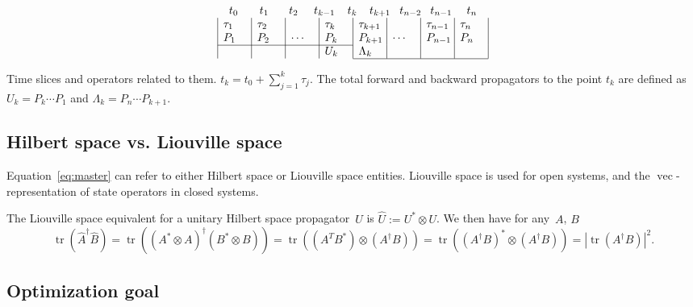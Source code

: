 \documentclass[aps, pra, a4paper, longbibliography]{revtex4}
\newcommand{\be}{\begin{equation}}
\newcommand{\ee}{\end{equation}}
\DeclareMathOperator{\tr}{tr}
\DeclareMathOperator{\cvec}{vec}
\begin{document}
\begin{table}[h]
\[
\begin{array}{c}
\begin{array}{@{t_0}p{1.9em}@{t_1}p{1.8em}@{t_2}p{1.4em}@{t_{k-1}}p{1.1em}@{t_{k}}p{1.1em}@{t_{k+1}}p{0.8em}@{t_{n-2}}p{0.8em}@{t_{n-1}}p{1.3em}@{t_n}}
& & & & & & &
\end{array}\\
\begin{array}{|p{2em}|p{2em}|p{2em}|p{2em}|p{2em}|p{2em}|p{2em}|p{2em}|}
 $\tau_1$ & $\tau_2$ & & $\tau_k$ & $\tau_{k+1}$ & & $\tau_{n-1}$ & $\tau_n$ \\
 $P_1$ & $P_2$ & $\cdots$ & $P_k$ & $P_{k+1}$ & $\cdots$ & $P_{n-1}$ & $P_n$ \\
\cline{1-4}
& & & $U_{k}$ & $\Lambda_{k}$ & & & \\
\cline{5-8}
\end{array}
\end{array}
\]
\caption{Time slices and operators related to them.
$t_k = t_0 + \sum_{j=1}^{k} \tau_j$.
The total forward and backward
propagators to the point $t_k$ are defined as
$U_k = P_k \cdots P_1$ and
$\Lambda_k = P_{n} \cdots P_{k+1}$.}
\end{table}




\subsection{Hilbert space vs. Liouville space}

Equation~\eqref{eq:master} can refer to either Hilbert space or
Liouville space entities. Liouville space is used
for open systems, and the $\cvec$-representation of state operators in
closed systems.

The Liouville space equivalent for a unitary Hilbert space
propagator~$U$ is $\hat{U} := U^* \otimes U$.
We then have for any~$A$, $B$
\be
\label{eq:hat-product}
\tr(\hat{A}^\dagger \hat{B})
= \tr((A^* \otimes A)^\dagger (B^* \otimes B))
= \tr((A^T B^*) \otimes (A^\dagger B))
= \tr((A^\dagger B)^* \otimes (A^\dagger B))
= |\tr(A^\dagger B)|^2.
\ee



\subsection{Optimization goal}
\end{document}
